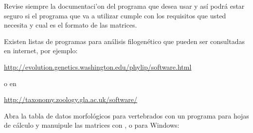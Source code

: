 Revise siempre la documentaci'on del programa que desea usar y as\'i podr\'a estar seguro si el programa que va a utilizar cumple con los requisitos que usted necesita y cual es el formato de las matrices.

Existen listas de programas para an\'alisis filogen\'etico que pueden ser consultadas en internet, por ejemplo:


\url{http://evolution.genetics.washington.edu/phylip/software.html}
 
o en 

\url{http://taxonomy.zoology.gla.ac.uk/software/}

Abra la tabla de datos morfol\'ogicos para vertebrados  con un programa para hojas de c\'alculo y manuipule las matrices con ,  o  para Windows:

